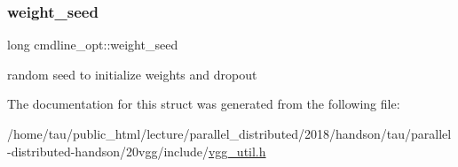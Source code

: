 \subsubsection{\texorpdfstring{weight\+\_\+seed}{weight\_seed}}
{\footnotesize\ttfamily long cmdline\+\_\+opt\+::weight\+\_\+seed}

random seed to initialize weights and dropout 

The documentation for this struct was generated from the following file\+:\begin{DoxyCompactItemize}
\item 
/home/tau/public\+\_\+html/lecture/parallel\+\_\+distributed/2018/handson/tau/parallel-\/distributed-\/handson/20vgg/include/\hyperlink{vgg__util_8h}{vgg\+\_\+util.\+h}\end{DoxyCompactItemize}
